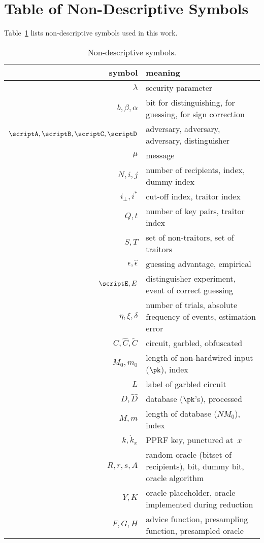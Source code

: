 \section{Table of Non-Descriptive Symbols}\label{sec:symbols}

Table~\ref{tab:symbols} lists non-descriptive symbols used in this work.

\begin{table}
\capstart
\centering
\caption{Non-descriptive symbols.}
\label{tab:symbols}
\begingroup
\setlength{\tabcolsep}{4pt}
\begin{tabular}{rl}
\toprule
\textbf{symbol} & \textbf{meaning} \\
\midrule
$\lambda$ & security parameter \\
$b,\beta,\alpha$ & bit for distinguishing, for guessing, for sign correction \\
$\scriptA,\scriptB,\scriptC,\scriptD$ & adversary, adversary, adversary, distinguisher \\
$\mu$ & message \\
$N,i,j$ & number of recipients, index, dummy index \\
$i_\bot,i^\ast$ & cut-off index, traitor index \\
$Q,t$ & number of key pairs, traitor index \\
$S,T$ & set of non-traitors, set of traitors \\
$\epsilon,\widehat{\epsilon}$ & guessing advantage, empirical \\
$\scriptE,E$ & distinguisher experiment, event of correct guessing \\
$\eta,\xi,\delta$ & number of trials, absolute frequency of events, estimation error \\
$C,\widehat{C},\widetilde{C}$ & circuit, garbled, obfuscated \\
$M_0,m_0$ & length of non-hardwired input ($\pk$), index \\
$L$ & label of garbled circuit \\
$D,\widehat{D}$ & database ($\pk$'s), processed \\
$M,m$ & length of database ($NM_0$), index \\
$k,\mathring{k}_x$ & PPRF key, punctured at~$x$ \\
$R,r,s,A$ & random oracle (bitset of recipients), bit, dummy bit, oracle algorithm \\
$Y,K$ & oracle placeholder, oracle implemented during reduction \\
$F,G,H$ & advice function, presampling function, presampled oracle \\
\bottomrule
\end{tabular}
\endgroup
\end{table}
